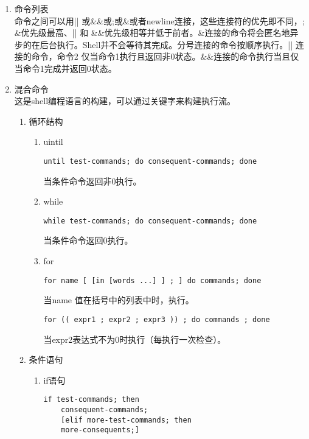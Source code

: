\begin{itemize}
\begin{enumerate}
				| or |\& 符号 格式如下：
\begin{lstlisting}[numbers = none]
[time [-p]] [!] command1 [ | or |& command2 ] ...
\end{lstlisting}
				|\&是标准错误，即将标准错误加到他的标准输出中区，然后输出给下一个命令。time 关键字是用来输出时间的-p选项是用POSIX格式...
				\item 命令列表\\
				命令之间可以用|| 或\&\&或;或\&或者newline连接，这些连接符的优先即不同，; \&优先级最高、|| 和 \&\&优先级相等并低于前者。\&连接的命令将会匿名地异步的在后台执行。Shell并不会等待其完成。分号连接的命令按顺序执行。|| 连接的命令，命令2 仅当命令1执行且返回非0状态。\&\&连接的命令执行当且仅当命令1完成并返回0状态。
				\item 混合命令\\
				这是shell编程语言的构建，可以通过关键字来构建执行流。
				\begin{enumerate}
					\item 循环结构\\
					\begin{enumerate}
						\item uintil
\begin{lstlisting}[numbers = none]
	until test-commands; do consequent-commands; done
\end{lstlisting}
					当条件命令返回非0执行。
						\item while
\begin{lstlisting}[numbers = none]
	while test-commands; do consequent-commands; done
\end{lstlisting}	当条件命令返回0执行。					
						\item for
\begin{lstlisting}[numbers = none]
	for name [ [in [words ...] ] ; ] do commands; done 
\end{lstlisting}
				当name 值在括号中的列表中时，执行。
\begin{lstlisting}[numbers = none]
	for (( expr1 ; expr2 ; expr3 )) ; do commands ; done
\end{lstlisting}
				当expr2表达式不为0时执行（每执行一次检查）。
					\end{enumerate}
					\item 条件语句
					\begin{enumerate}
						\item if语句
\begin{lstlisting}[numbers = none]
	if test-commands; then
	consequent-commands;
	[elif more-test-commands; then
	more-consequents;]

\end{lstlisting}
\end{enumerate}
\end{enumerate}
\end{enumerate}
\end{itemize}
